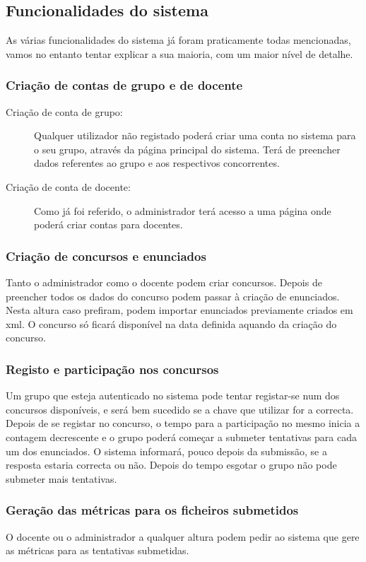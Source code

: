 \subsection{Funcionalidades do sistema}
As várias funcionalidades do sistema já foram praticamente todas mencionadas, vamos no entanto tentar explicar a sua maioria, com um maior nível de
detalhe.

\subsubsection{Criação de contas de grupo e de docente}
\begin{description}
 \item[Criação de conta de grupo:] Qualquer utilizador não registado poderá criar uma conta no sistema para o seu grupo, através da página principal do sistema.
Terá de preencher dados referentes ao grupo e aos respectivos concorrentes.
 \item[Criação de conta de docente:] Como já foi referido, o administrador terá acesso a uma página onde poderá criar contas para docentes.
\end{description}

\subsubsection{Criação de concursos e enunciados}
Tanto o administrador como o docente podem criar concursos. Depois de preencher todos os dados do concurso podem passar à criação de enunciados.
Nesta altura caso prefiram, podem importar enunciados previamente criados em xml.
O concurso só ficará disponível na data definida aquando da criação do concurso.

\subsubsection{Registo e participação nos concursos}
Um grupo que esteja autenticado no sistema pode tentar registar-se num dos concursos disponíveis, e será bem sucedido se a chave que utilizar for a correcta.\\
Depois de se registar no concurso, o tempo para a participação no mesmo inicia a contagem decrescente e o grupo poderá começar a submeter tentativas para
cada um dos enunciados. O sistema informará, pouco depois da submissão, se a resposta estaria correcta ou não.
Depois do tempo esgotar o grupo não pode submeter mais tentativas.

\subsubsection{Geração das métricas para os ficheiros submetidos}
O docente ou o administrador a qualquer altura podem pedir ao sistema que gere as métricas para as tentativas submetidas.

